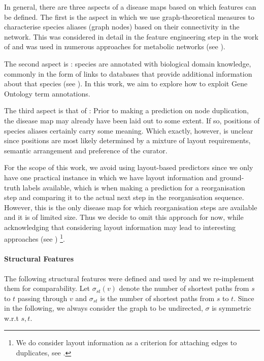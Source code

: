 \documentclass[
	fontsize=10pt, %
	twoside=false, %
	secnumdepth=1, %
  toc=indentunnumbered %
]{kaobook}
\begin{document}
In general, there are three aspects of a disease maps based on which features
can be defined. The first is the  aspect in which we use
graph-theoretical measures to characterise species aliases (graph nodes) based
on their connectivity in the network. This was considered in detail in the
feature engineering step in the work of
\citeauthor{nielsen_MachineLearningSupport_2019} and was used in numerous
approaches for metabolic networks (see ).

The second aspect is : species are annotated with biological
domain knowledge, commonly in the form of links to databases that provide
additional information about that species (see ). In
this work, we aim to explore how to exploit Gene Ontology term annotations.

The third aspect is that of : Prior to making a prediction on node
duplication, the disease map may already have been laid out to some extent.
If so, positions of species aliases certainly carry some meaning. Which exactly,
however, is unclear since positions are most likely determined by a mixture of
layout requirements, semantic arrangement and preference of the curator.

For the scope of this work, we avoid using layout-based predictors
since we only have one practical instance in which we have layout information
and ground-truth labels available, which is when making a prediction for a
 reorganisation step and comparing it to the actual next
step in the reorganisation sequence. However, this is the only disease map for
which reorganisation steps are available and it is of limited size. Thus we
decide to omit this approach for now, while acknowledging that considering
layout information may lead to interesting approaches (see
) \footnote{ We do consider layout information as a
  criterion for attaching edges to duplicates, see . }.




\paragraph{Structural Features} The following structural features were defined
and used by \citeauthor{nielsen_MachineLearningSupport_2019} and we re-implement
them for comparability. Let $\sigma_{st}(v)$ denote the number of shortest paths
from $s$ to $t$ passing through $v$ and $\sigma_{st}$ is the number of shortest
paths from $s$ to $t$. Since in the following, we always consider the graph to
be undirected, $\sigma$ is symmetric w.r.t $s, t$. 
\end{document}

